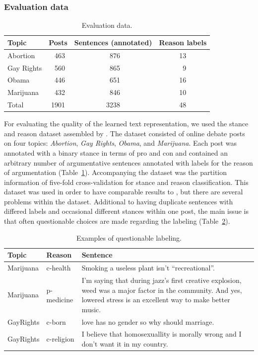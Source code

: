 \documentclass[11pt]{article}
\begin{document}
\subsubsection*{Evaluation data}

\begin{table}
  \centering
  \begin{tabular}{lccc}
    \toprule
    Topic & Posts & Sentences (annotated) & Reason labels\\
    \midrule
    Abortion   &~463 &~876 &13\\
    Gay Rights &~560 &~865 &~9\\
    Obama      &~446 &~651 &16\\
    Marijuana  &~432 &~846 &10\\
    \midrule
    Total      &1901 &3238 &48\\
    \bottomrule
  \end{tabular}
  \caption{\label{tab:data-eval}Evaluation data.}
\end{table}

For evaluating the quality of the learned text representation,
we used the stance and reason dataset assembled by \textcite{hasan2014you}.
The dataset consisted of online debate posts on four topics:
\textit{Abortion}, \textit{Gay Rights}, \textit{Obama}, and \textit{Marijuana}.
Each post was annotated with a binary stance in terms of pro and con
and contained an arbitrary number of argumentative sentences annotated with labels for the reason of argumentation
(Table~\ref{tab:data-eval}).
Accompanying the dataset was the partition information of five-fold cross-validation
for stance and reason classification.
This dataset was used in order to have comparable results to \textcite{boltuvzic2015identifying},
but there are several problems within the dataset.
Additional to having duplicate sentences with differed labels and occasional different stances within one post,
the main issue is that often questionable choices are made regarding the labeling (Table~\ref{tab:label-examples}).

\begin{table}
  \centering
  \begin{tabular}{lll}
    \toprule
    Topic & Reason & Sentence\\
    \midrule
    Marijuana & c-health & \multicolumn{1}{p{8cm}}{Smoking a useless plant isn't ``recreational''.} \\
    Marijuana & p-medicine & \multicolumn{1}{p{8cm}}{I’m saying that during jazz’s first creative explosion, weed was a major factor in the community. And yes, lowered stress is an excellent way to make better music.} \\
    GayRights & c-born & \multicolumn{1}{p{8cm}}{love has no gender so why should marriage.}\\
    GayRights & c-religion & \multicolumn{1}{p{8cm}}{I believe that homosexuallity is morally wrong and I don’t want it in my country.} \\
    \bottomrule
  \end{tabular}
  \caption{\label{tab:label-examples}Examples of questionable labeling.}
\end{table}
\end{document}
